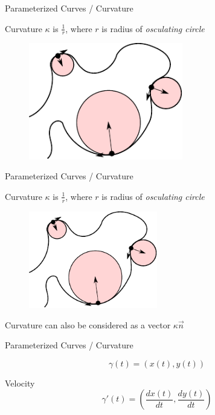 \documentclass{beamer}
\begin{document}
\begin{frame}{Parameterized Curves / Curvature}

Curvature $\kappa$ is $\frac{1}{r}$, where $r$ is radius of {\em osculating circle}

\begin{figure}[t]
    \includegraphics[width=0.6\textwidth]{2DCurvatureVectors.pdf}
\end{figure}

\end{frame}

\begin{frame}{Parameterized Curves / Curvature}

Curvature $\kappa$ is $\frac{1}{r}$, where $r$ is radius of {\em osculating circle}

\begin{figure}[t]
    \includegraphics[width=0.5\textwidth]{2DCurvatureVectors.pdf}
\end{figure}

Curvature can also be considered as a vector $\kappa \vec{n}$

\end{frame}

\begin{frame}{Parameterized Curves / Curvature}

\[ \gamma(t) = (x(t), y(t)) \]

Velocity
\[ \gamma'(t) = \left(\frac{d x(t)}{dt}, \frac{d y(t)}{dt} \right) \]



\end{frame}
\end{document}
